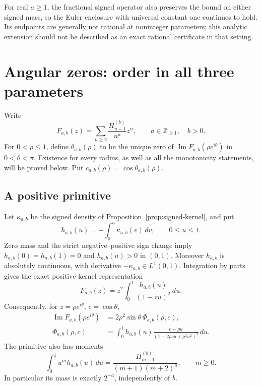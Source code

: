 \documentclass[11pt]{article}
\numberwithin{equation}{section}
\theoremstyle{plain}
\theoremstyle{definition}
\theoremstyle{remark}
\begin{document}
For real $a\ge1$, the fractional signed operator also preserves the
bound on either signed mass, so the Euler enclosure with universal
constant one continues to hold. Its endpoints are generally not
rational at noninteger parameters; this analytic extension should
not be described as an exact rational certificate in that setting.



\section{Angular zeros: order in all three parameters}

Write
\[
 F_{a,b}(z)=\sum_{n\ge2}\frac{H_{n-1}^{(b)}}{n^a}z^n,
 \qquad a\in\mathbb Z_{\ge1},\quad b>0.
\]
For $0<\rho\le1$, define $\theta_{a,b}(\rho)$ to be the unique zero
of $\operatorname{Im}F_{a,b}(\rho e^{i\theta})$ in $0<\theta<\pi$.
Existence for every radius, as well as all the monotonicity statements,
will be proved below. Put $c_{a,b}(\rho)=\cos\theta_{a,b}(\rho)$.

\subsection{A positive primitive}

Let $\kappa_{a,b}$ be the signed density of Proposition~\ref{prop:signed-kernel}, and put
\[
 h_{a,b}(u)=-\int_0^u\kappa_{a,b}(v)\,dv,\qquad 0\le u\le1.
\]
Zero mass and the strict negative--positive sign change imply
$h_{a,b}(0)=h_{a,b}(1)=0$ and $h_{a,b}(u)>0$ in $(0,1)$.
Moreover $h_{a,b}$ is absolutely continuous, with derivative
$-\kappa_{a,b}\in L^1(0,1)$. Integration by parts gives the exact
positive-kernel representation
\begin{equation}\label{an:eq:positive}
 F_{a,b}(z)=z^2\int_0^1\frac{h_{a,b}(u)}{(1-zu)^2}\,du.
\end{equation}
Consequently, for $z=\rho e^{i\theta}$, $c=\cos\theta$,
\begin{align}
 \operatorname{Im}F_{a,b}(\rho e^{i\theta})
 &=2\rho^2\sin\theta\,\Phi_{a,b}(\rho,c),\label{an:eq:phi}\\
 \Phi_{a,b}(\rho,c)
 &=\int_0^1 h_{a,b}(u)
       \frac{c-\rho u}{(1-2\rho cu+\rho^2u^2)^2}\,du.
\end{align}
The primitive also has moments
\begin{equation}\label{an:eq:hmoments}
 \int_0^1u^m h_{a,b}(u)\,du
 =\frac{H_{m+1}^{(b)}}{(m+1)(m+2)^a},\qquad m\ge0.
\end{equation}
In particular its mass is exactly $2^{-a}$, independently of $b$.
\end{document}
